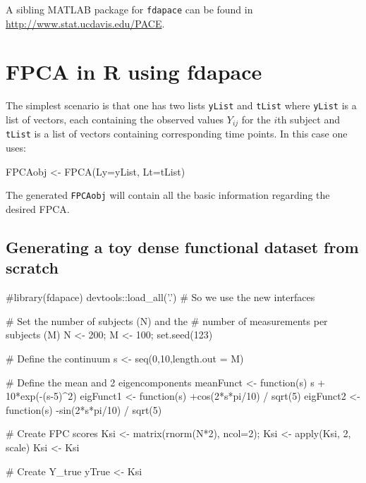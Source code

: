 \documentclass[11pt,english]{article}\usepackage[]{graphicx}\usepackage[]{color}
\begin{document}
A sibling MATLAB package for \texttt{fdapace} can be found in \url{http://www.stat.ucdavis.edu/PACE}.
\section{FPCA in R using fdapace}

The simplest scenario is that one has two lists \texttt{yList} and \texttt{tList} where \texttt{yList} is a list of vectors, each containing the observed values $Y_{ij}$ for the $i$th subject and \texttt{tList} is a list of vectors containing corresponding time points. In this case one uses: 

\begin{Schunk}
\begin{Sinput}
FPCAobj <- FPCA(Ly=yList, Lt=tList)
\end{Sinput}
\end{Schunk}
The generated \texttt{FPCAobj} will contain all the basic information regarding the desired FPCA.


\subsection{Generating a toy dense functional dataset from scratch}

\begin{Schunk}
\begin{Sinput}
  #library(fdapace)
  devtools::load_all('.') # So we use the new interfaces

  # Set the number of subjects (N) and the
  # number of measurements per subjects (M) 
  N <- 200;   
  M <- 100;
  set.seed(123)

  # Define the continuum
  s <- seq(0,10,length.out = M)
 
  # Define the mean and 2 eigencomponents
  meanFunct <- function(s) s + 10*exp(-(s-5)^2)
  eigFunct1 <- function(s) +cos(2*s*pi/10) / sqrt(5)
  eigFunct2 <- function(s) -sin(2*s*pi/10) / sqrt(5)
  
  # Create FPC scores
  Ksi <- matrix(rnorm(N*2), ncol=2);
  Ksi <- apply(Ksi, 2, scale)
  Ksi <- Ksi %*% diag(c(5,2))
 
  # Create Y_true
  yTrue <- Ksi %*% t(matrix(c(eigFunct1(s),eigFunct2(s)), ncol=2)) + t(matrix(rep(meanFunct(s),N), nrow=M))
\end{Sinput}
\end{Schunk}
\end{document}

